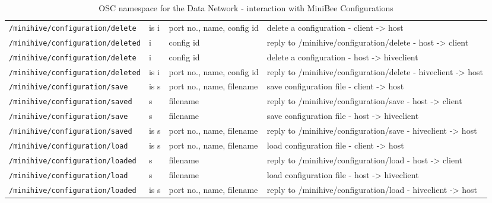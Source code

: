 \documentclass[letterpaper,10pt]{article}
\begin{document}
\begin{sidewaystable}[!tbp]
\begin{center}
\begin{tabular}{|llll|}
\verb|/minihive/configuration/delete| & is i & port no., name, config id & delete a configuration - client -> host\\
\verb|/minihive/configuration/deleted| & i & config id & reply to /minihive/configuration/delete -  host -> client\\
\verb|/minihive/configuration/delete| & i & config id & delete a configuration  - host -> hiveclient\\
\verb|/minihive/configuration/deleted| & is i & port no., name, config id & reply to /minihive/configuration/delete - hiveclient -> host\\
\hline
\verb|/minihive/configuration/save| & is s & port no., name, filename & save configuration file - client -> host\\
\verb|/minihive/configuration/saved| & s & filename & reply to /minihive/configuration/save - host -> client\\
\verb|/minihive/configuration/save| & s & filename &  save configuration file -  host -> hiveclient\\
\verb|/minihive/configuration/saved| & is s & port no., name, filename & reply to /minihive/configuration/save - hiveclient -> host\\

\verb|/minihive/configuration/load| & is s & port no., name, filename & load configuration file - client -> host\\
\verb|/minihive/configuration/loaded| & s & filename & reply to /minihive/configuration/load - host -> client\\
\verb|/minihive/configuration/load| & s & filename &  load configuration file -  host -> hiveclient\\
\verb|/minihive/configuration/loaded| & is s & port no., name, filename & reply to /minihive/configuration/load - hiveclient -> host\\

\hline

\end{tabular}
\end{center}
\caption{OSC namespace for the Data Network - interaction with MiniBee Configurations }
\label{oscinterfaceMBC}
 \end{sidewaystable}
\end{document}
